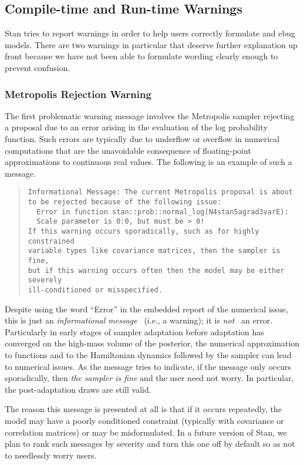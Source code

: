 \subsection{Compile-time and Run-time Warnings}

Stan tries to report warnings in order to help users correctly
formulate and ebug models.  There are two warnings in particular that
deserve further explanation up front because we have not been able to
formulate wording clearly enough to prevent confusion.

\subsubsection{Metropolis Rejection Warning}

The first problematic warning message involves the Metropolis sampler
rejecting a proposal due to an error arising in the evaluation of the
log probability function.  Such errors are typically due to underflow
or overflow in numerical computations that are the unavoidable
consequence of floating-point approximations to continuous real
values.  The following is an example of such a message.
%
\begin{quote}\small
\begin{Verbatim}
Informational Message: The current Metropolis proposal is about
to be rejected because of the following issue:
  Error in function stan::prob::normal_log(N4stan5agrad3varE): 
  Scale parameter is 0:0, but must be > 0!
If this warning occurs sporadically, such as for highly constrained
variable types like covariance matrices, then the sampler is fine, 
but if this warning occurs often then the model may be either severely 
ill-conditioned or misspecified.
\end{Verbatim}
\end{quote}
%
Despite using the word ``Error'' in the embedded report of the
numerical issue, this is just an \emph{informational message} \,
(i.e., a warning); it is \emph{not} \, an error.  Particularly in
early stages of sampler adaptation before adaptation has converged on
the high-mass volume of the posterior, the numerical approximation to
functions and to the Hamiltonian dynamics followed by the sampler can
lead to numerical issues.  As the message tries to indicate, if the
message only occurs sporadically, then {\it the sampler is fine} and
the user need not worry.  In particular, the post-adaptation draws are
still valid.

The reason this message is presented at all is that if it occurs
repeatedly, the model may have a poorly conditioned constraint
(typically with covariance or correlation matrices) or may be
misformulated.  In a future version of Stan, we plan to rank such
messages by severity and turn this one off by default so as not to
needlessly worry users.

